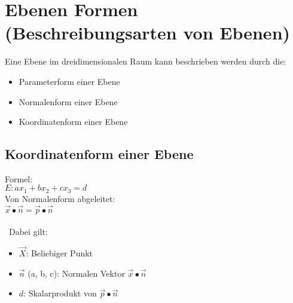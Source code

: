 
\section{Ebenen Formen (Beschreibungsarten von Ebenen)}
Eine Ebene im dreidimensionalen Raum kann beschrieben werden durch die:
\begin{itemize}
    \item Parameterform einer Ebene
    \item Normalenform einer Ebene
    \item Koordinatenform einer Ebene
\end{itemize}

\subsection{Koordinatenform einer Ebene}
Formel: \\
$
E: ax_1 + bx_2 + cx_3 = d
$
\\
Von Normalenform abgeleitet: \\
$\vec{x} \bullet \vec{n} = \vec{p} \bullet \vec{n}$ \\\\
\
Dabei gilt:
\begin{itemize}
    \item $\vec{X}$: Beliebiger Punkt
    \item $\vec{n}$ (a, b, c): Normalen Vektor $\vec{x} \bullet \vec{n}$
    \item $d$: Skalarprodukt von $\vec{p} \bullet \vec{n}$
\end{itemize}
